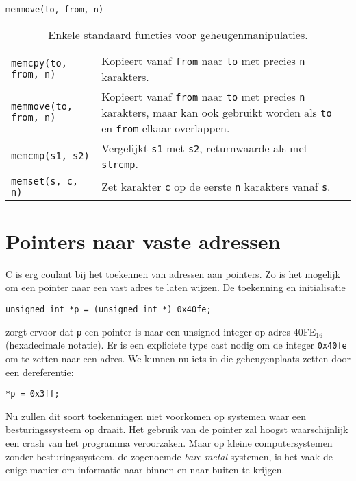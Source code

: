 \hbox{\texttt{memmove(to, from, n)}}
\begin{table}[!ht]
\centering
\caption{Enkele standaard functies voor geheugenmanipulaties.}
\label{tab:arymemmanip}
\begin{tabular}{@{}p{}p{10cm}@{}}
\toprule
\texttt{memcpy(to, from, n)} &  Kopieert vanaf \texttt{from} naar \texttt{to} met precies \texttt{n} karakters.\\
\texttt{memmove(to, from, n)} &  Kopieert vanaf \texttt{from} naar \texttt{to} met precies \texttt{n} karakters, maar kan ook gebruikt worden als \texttt{to} en \texttt{from} elkaar overlappen.\\
\texttt{memcmp(s1, s2)} &  Vergelijkt \texttt{s1} met \texttt{s2}, returnwaarde als met \texttt{strcmp}.\\
\texttt{memset(s, c, n)} & Zet karakter \texttt{c} op de eerste \texttt{n} karakters vanaf \texttt{s}.\\
\bottomrule
\end{tabular} 
\end{table}


\advanced
\section{Pointers naar vaste adressen}
C is erg coulant bij het toekennen van adressen aan pointers. Zo is het mogelijk om een pointer naar een vast adres te laten wijzen.
De toekenning en initialisatie

\hspace*{1em}\texttt{unsigned int *p = (unsigned int *) 0x40fe;}

zorgt ervoor dat \texttt{p} een pointer is naar een unsigned integer op adres 40FE$_{16}$ (hexadecimale notatie). Er is een expliciete type cast nodig om de integer \texttt{0x40fe} om te zetten naar een adres. We kunnen nu iets in die geheugenplaats zetten door een dereferentie:

\hspace*{1em}\texttt{*p = 0x3ff;}


Nu zullen dit soort toekenningen niet voorkomen op systemen waar een besturingssysteem op draait. Het gebruik van de pointer zal hoogst waarschijnlijk een crash van het programma veroorzaken. Maar op kleine computersystemen zonder besturingssysteem, de zogenoemde \textsl{bare metal}-systemen, is het vaak de enige manier om informatie naar binnen en naar buiten te krijgen.

